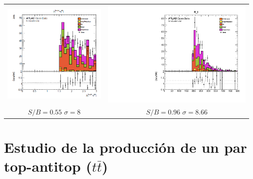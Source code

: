\documentclass[10pt]{beamer}
\begin{document}
\begin{frame}
\begin{center}
\begin{tabular}{cc}
		\includegraphics[scale=0.23]{deltaeta.png} &
		
		
		\includegraphics[scale=0.19]{htcarles} \\
			$S/B=0.55$ $\sigma=8$ & $S/B=0.96$ $\sigma=8.66$ 
		
		
	\end{tabular}
\end{center}
\end{frame}
\section{Estudio de la producción de un par top-antitop ($t\bar{t}$)}
\end{document}
